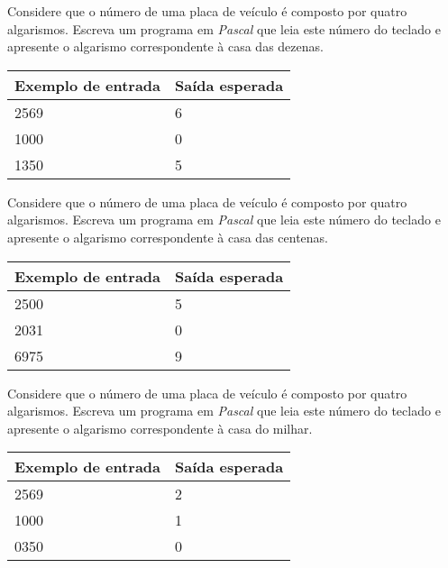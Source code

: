 \item Considere que o número de uma placa de veículo é composto por quatro 
algarismos. Escreva um programa em \emph{Pascal} que leia este número  do
teclado e apresente o algarismo correspondente à casa das dezenas.

\begin{center}
\begin{tabular}{|l|l|} \hline
Exemplo de entrada & Saída esperada \\ \hline
2569                & 6               \\ \hline
1000                & 0               \\ \hline
1350                & 5               \\ \hline
\end{tabular}
\end{center}

\item Considere que o número de uma placa de veículo é composto por quatro 
algarismos. Escreva um programa em \emph{Pascal} que leia este número  do
teclado e apresente o algarismo correspondente à casa das centenas.

\begin{center}
\begin{tabular}{|l|l|} \hline
Exemplo de entrada & Saída esperada \\ \hline
2500                & 5               \\ \hline
2031                & 0               \\ \hline
6975                & 9               \\ \hline
\end{tabular}
\end{center}

\item Considere que o número de uma placa de veículo é composto por quatro 
algarismos. Escreva um programa em \emph{Pascal} que leia este número  do
teclado e apresente o algarismo correspondente à casa do milhar.

\begin{center}
\begin{tabular}{|l|l|} \hline
Exemplo de entrada & Saída esperada \\ \hline
2569                & 2               \\ \hline
1000                & 1               \\ \hline
0350                & 0               \\ \hline
\end{tabular}
\end{center}


